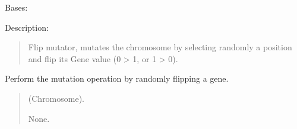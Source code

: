 \documentclass[letterpaper,10pt,english]{sphinxmanual}
\begin{document}
\begin{fulllineitems}
\label{\detokenize{pygenalgo.operators.mutation:pygenalgo.operators.mutation.flip_mutator.FlipMutator}}
\pysigstartsignatures
{}
\pysigstopsignatures
\sphinxAtStartPar
Bases: {\hyperref[\detokenize{pygenalgo.operators.mutation:pygenalgo.operators.mutation.mutate_operator.MutationOperator}]{}}

\sphinxAtStartPar
Description:
\begin{quote}

\sphinxAtStartPar
Flip mutator, mutates the chromosome by selecting randomly
a position and flip its Gene value (0 \sphinxhyphen{}\textgreater{} 1, or 1 \sphinxhyphen{}\textgreater{} 0).
\end{quote}

\begin{fulllineitems}
\label{\detokenize{pygenalgo.operators.mutation:pygenalgo.operators.mutation.flip_mutator.FlipMutator.mutate}}
\pysigstartsignatures
{}
\pysigstopsignatures
\sphinxAtStartPar
Perform the mutation operation by randomly flipping a gene.
\begin{quote}\begin{description}
\sphinxAtStartPar
{} \textendash{} (Chromosome).

\sphinxAtStartPar
None.

\end{description}\end{quote}

\end{fulllineitems}


\end{fulllineitems}
\end{document}
